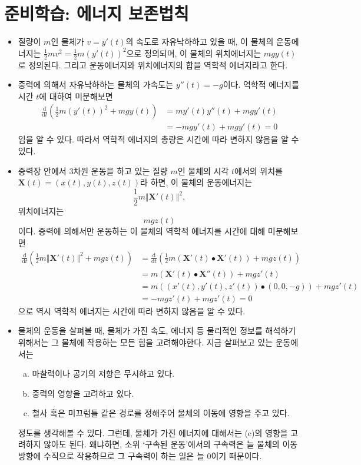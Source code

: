 \section{준비학습: 에너지 보존법칙}

\begin{itemize}
\item 질량이 $m$인 물체가 $v=y'(t)$의 속도로 자유낙하하고 있을 때, 이 물체의 운동에너지는 $\frac{1}{2}mv^2=\frac{1}{2}m(y'(t))^2$으로 정의되며, 이 물체의 위치에너지는 $mgy(t)$로 정의된다. 그리고 운동에너지와 위치에너지의 합을 역학적 에너지라고 한다.

\item 중력에 의해서 자유낙하하는 물체의 가속도는 $y''(t)=-g$이다. 역학적 에너지를 시간 $t$에 대하여 미분해보면
\begin{align*}
\frac{\mathrm{d}}{\mathrm{d}t}\left( \frac{1}{2}m(y'(t))^2+mgy(t)\right) &= my'(t)y''(t)+mgy'(t) \\
&= -mgy'(t)+mgy'(t)=0
\end{align*}
임을 알 수 있다. 따라서 역학적 에너지의 총량은 시간에 따라 변하지 않음을 알 수 있다.

\item 중력장 안에서 $3$차원 운동을 하고 있는 질량 $m$인 물체의 시각 \(t\)에서의 위치를 $\mathbf{X}(t)=(x(t), y(t), z(t))$라 하면, 이 물체의 운동에너지는
\[
\frac{1}{2}m\Vert \mathbf{X}'(t)\Vert^2,
\]
위치에너지는
\[
mgz(t)
\]
이다. 중력에 의해서만 운동하는 이 물체의 역학적 에너지를 시간에 대해 미분해보면
\begin{align*}
\frac{\mathrm{d}}{\mathrm{d}t}\left( \frac{1}{2}m\Vert \mathbf{X}'(t)\Vert^2+mgz(t)\right)& = \frac{\mathrm{d}}{\mathrm{d}t}\left( \frac{1}{2}m(\mathbf{X}'(t)\bullet\mathbf{X}'(t))+mgz(t)\right) \\
& = m (\mathbf{X}'(t)\bullet\mathbf{X}''(t))+mgz'(t) \\
& = m\left( (x'(t), y'(t), z'(t))\bullet(0, 0, -g)\right)+mgz'(t) \\
&= -mgz'(t)+mgz'(t)=0
\end{align*}
으로 역시 역학적 에너지는 시간에 따라 변하지 않음을 알 수 있다.
\item 물체의 운동을 살펴볼 때, 물체가 가진 속도, 에너지 등 물리적인 정보를 해석하기 위해서는 그 물체에 작용하는 모든 힘을 고려해야한다. 지금 살펴보고 있는 운동에서는
\begin{enumerate}[(a)]
\item 마찰력이나 공기의 저항은 무시하고 있다.
\item 중력의 영향을 고려하고 있다.
\item 철사 혹은 미끄럼틀 같은 경로를 정해주어 물체의 이동에 영향을 주고 있다.
\end{enumerate}
정도를 생각해볼 수 있다. 그런데, 물체가 가진 에너지에 대해서는 (c)의 영향을 고려하지 않아도 된다. 왜냐하면, 소위 `구속된 운동'에서의 구속력은 늘 물체의 이동방향에 수직으로 작용하므로 그 구속력이 하는 일은 늘 $0$이기 때문이다.
\end{itemize}

